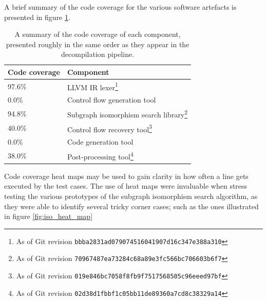 A brief summary of the code coverage for the various software artefacts is presented in figure \ref{tbl:code_coverage_summary}.

\begin{savenotes}
	\begin{table}[htbp]
		\begin{center}
			\begin{tabular}{|l|l|}
				\hline
				Code coverage & Component \\
				\hline
				97.6\% & LLVM IR lexer\footnote{As of Git revision \texttt{bbba2831ad079074516041907d16c347e388a310}} \\
				0.0\% & Control flow generation tool \\
				94.8\% & Subgraph isomorphism search library\footnote{As of Git revision \texttt{70967487ea73284c68a89e3fc566bc706603b6f7}} \\
				40.0\% & Control flow recovery tool\footnote{As of Git revision \texttt{019e846bc7058f8fb9f7517568505c96eeed97bf}} \\
				0.0\% & Code generation tool \\
				38.0\% & Post-processing tool\footnote{As of Git revision \texttt{02d38d1fbbf1c05bb11de89360a7cd8c38329a14}} \\
				\hline
			\end{tabular}
		\end{center}
		\caption{A summary of the code coverage of each component, presented roughly in the same order as they appear in the decompilation pipeline.}
		\label{tbl:code_coverage_summary}
	\end{table}
\end{savenotes}

Code coverage heat maps may be used to gain clarity in how often a line gets executed by the test cases. The use of heat maps were invaluable when stress testing the various prototypes of the subgraph isomorphism search algorithm, as they were able to identify several tricky corner cases; such as the ones illustrated in figure \ref{fig:iso_heat_map}

